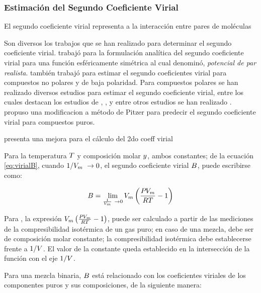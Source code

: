 \subsubsection{Estimación del Segundo Coeficiente Virial}
  
    El segundo coeficiente virial representa a la interacción entre pares de moléculas

Son diversos los trabajos que se han realizado para determinar el segundo coeficiente virial. \autocite[postnote]{woolley1969second} trabajó para la formulación analítica del segundo coeficiente virial para una función esféricamente simétrica al cual denominó, \textit{potencial de par realista}. \parencite{pitzer1990second} también trabajó para estimar el segundo coeficientes virial para compuestos no polares y de baja polaridad. Para compuestos polares se han realizado diversos estudios para estimar el segundo coeficiente virial, entre los cuales destacan los estudios de \parencite{maris1985interaction}, \parencite{tarakad1977improved}, y entre otros estudios se han realizado . \parencite{vetere2007simple} propuso una modificacion a método de Pitzer para predecir el segundo coeficiente virial para compuestos puros.

\parencite{klotz1985improved} presenta una mejora para el cálculo del 2do coeff virial



Para la temperatura $T$ y composición molar ${y_{}}$, ambos constantes; de la ecuación \eqref{eq:virialB}, cuando $1 / V_m\ \to 0$,  el segundo coeficiente virial $B_{}$, puede escribirse como:

\begin{equation}
  \bCoeffVirial{} = \lim_{\frac{1}{\Vm}\ \to {0}} \Vm \left(\frac{\P{} \Vm} {\UnivConstantGas \T{}} - 1 \right)
\end{equation}

Para \parencite[p. 473]{beattie1942second}, la expresión $V_m \left(\frac{P_{} V_m} {R T} - 1 \right)$, puede ser calculado a partir de las mediciones de la compresibilidad isotérmica de un gas puro; en caso de una mezcla, debe ser de composición molar constante; la compresibilidad isotérmica debe establecerse frente a $1 / {V}$. El valor de la constante queda establecido en la intersección de la función con el eje $1/ {V}$.

Para una mezcla binaria, $B_{}$ está relacionado con los coeficientes viriales de los componentes puros y sus composiciones, de la siguiente manera:

